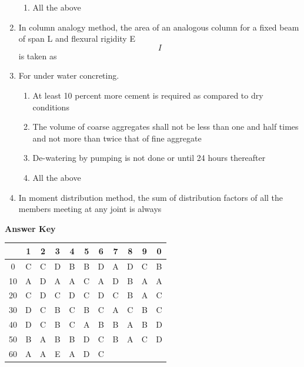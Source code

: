 \documentclass[11pt,a4paper]{article}
\begin{document}
\begin{enumerate}
\begin{enumerate}[label=\Alph*.]
\item{All the above}
\end{enumerate}
\item{In column analogy method, the area of an analogous column for a fixed beam of span L and flexural rigidity E$$I$$ is taken as}
\\
\item{For under water concreting.}
\begin{enumerate}[label=\Alph*.]
\item{At least 10 percent more cement is required as compared to dry conditions}
\item{The volume of coarse aggregates shall not be less than one and half times and not more than twice that of fine aggregate}
\item{De-watering by pumping is not done or until 24 hours thereafter}
\item{All the above}
\end{enumerate}
\item{In moment distribution method, the sum of distribution factors of all the members meeting at any joint is always}
\\
\end{enumerate}
\textbf{Answer Key}
\begin{tabular}{ | c | c c c c c c c c c c | }
\hline
 & 1 & 2 & 3 & 4 & 5 & 6 & 7 & 8 & 9 & 0 \\
\hline
0 & C & C & D & B & B & D & A & D & C & B \\
10 & A & D & A & A & C & A & D & B & A & A \\
20 & C & D & C & D & C & D & C & B & A & C \\
30 & D & C & B & C & B & C & A & C & B & C \\
40 & D & C & B & C & A & B & B & A & B & D \\
50 & B & A & B & B & D & C & B & A & C & D \\
60 & A & A & E & A & D & C &   &   &   &   \\
\hline
\end{tabular}
\clearpage
\end{document}
